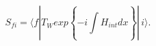 \begin{equation}
S_{fi} =
\langle f |
T_{\stackrel{\;}{\scriptscriptstyle\!\! W}} exp
\left\{
-i \int\limits_{}^{}
H_{int} dx
\right\}
|\, i \rangle.
\label{1.1}
\end{equation}

